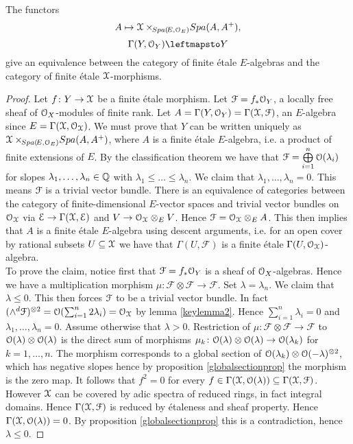 \begin{theorem}\label{gsctheorem}
The functors
\[A\mapsto \mathcal{X}\times\!\!_{{Spa({\!E},{\mathcal{O}_E})}}{Spa({A},{A{^{+}}})},\]
\[\Gamma(Y,\Oo_{Y})\leftmapsto Y\]
give an equivalence between the category of finite \'etale $E$-algebras and the category of finite \'etale $\mathcal{X}$-morphisms.
\end{theorem}
\begin{proof}
Let $f\colon Y\to \mathcal{X}$ be a  finite \'etale morphism. 
Let $\mathcal{F} = f_\ast\mathcal{O}_{Y}$, a locally free sheaf of $\mathcal{O}_{X}$-modules of finite rank.
Let $A=\Gamma(Y,\mathcal{O}_{Y}) = \Gamma(\mathcal{X},\mathcal{F})$, an $E$-algebra since $E=\Gamma(\mathcal{X},\mathcal{O}_{\mathcal{X}})$.
We must prove that $Y$ can be written uniquely as $\mathcal{X}\times\!\!_{{Spa({\!E},{\mathcal{O}_E})}}{Spa({A},{A{^{+}}})}$, where $A$ is a finite \'etale $E$-algebra, i.e. a product of finite extensions of $E$.
By the classification theorem we have that $\mathcal{F}=\bigoplus\limits_{i=1}^{n}\mathcal{O}(\lambda_{i})$ for slopes  $\lambda_1,\dots,\lambda_n\in\mathbb{Q}$ with $\lambda_1\leq\dots\leq\lambda_n$.
We claim that $\lambda_1,\dots,\lambda_n=0$. This means $\mathcal{F}$ is a trivial vector bundle. There is an equivalence of categories between the category of finite-dimensional $E$-vector spaces and trivial vector bundles on $\mathcal{O}_{\mathcal{X}}$ via
$\mathcal{E}\to \Gamma(\mathcal{X},\mathcal{E})$ and $V\to\mathcal{O}_{\mathcal{X}}\otimes_{E}V$. Hence $\mathcal{F}=\mathcal{O}_{\mathcal{X}}\otimes_{E}A$.
This then implies that $A$ is a finite \'etale $E$-algebra using descent arguments, i.e. for an open cover by rational subsets $U\subseteq\mathcal{X}$ we have that $\Gamma(U,\mathcal{F})$ is a finite  \'etale $\Gamma(U,\mathcal{O}_{\mathcal{X}})$-algebra.\\

To prove the claim, notice first that $\mathcal{F} = f_\ast\mathcal{O}_{Y}$ is a sheaf of  $\mathcal{O}_{X}$-algebras. 
Hence we have a multiplication morphism $\mu\colon\mathcal{F}\otimes\mathcal{F}\to\mathcal{F}$.
Set $\lambda=\lambda_n$.
We claim that $\lambda\leq0$. This then forces $\mathcal{F}$ to be a trivial vector bundle. In fact 
$(\wedge^d\mathcal{F})^{\otimes2} = \mathcal{O}(\sum_{i=1}^n2\lambda_{i}) = \mathcal{O}_{\mathcal{X}}$ by lemma \ref{keylemma2}. Hence $\sum_{i=1}^n\lambda_{i}=0$ and $\lambda_1,\dots,\lambda_n=0$.
Assume otherwise that $\lambda>0$.
Restriction of $\mu\colon\mathcal{F}\otimes\mathcal{F}\to\mathcal{F}$ to $\mathcal{O}(\lambda)\otimes\mathcal{O}(\lambda)$ is the direct sum of morphisms
$\mu_k\colon\mathcal{O}(\lambda)\otimes\mathcal{O}(\lambda)\to\mathcal{O}(\lambda_k)$ for $k=1,\dots,n$.
The morphism corresponds to a global section of $\mathcal{O}(\lambda_k)\otimes\mathcal{O}(-\lambda)^{\otimes2}$, which has negative slopes hence by proposition \ref{globalsectionprop} the morphism is the zero map.
It follows that $f^2=0$ for every $f\in\Gamma(\mathcal{X},\mathcal{O}(\lambda))\subseteq\Gamma(\mathcal{X},\mathcal{F})$. However $\mathcal{X}$ can be covered by adic spectra of reduced rings, in fact integral domains. Hence $\Gamma(\mathcal{X},\mathcal{F})$ is reduced by \'etaleness and sheaf property.
Hence $\Gamma(\mathcal{X},\mathcal{O}(\lambda))=0$. By proposition \ref{globalsectionprop} this is a contradiction, hence $\lambda\leq0$.


\end{proof}
\clearpage
\hfill
\clearpage







			



